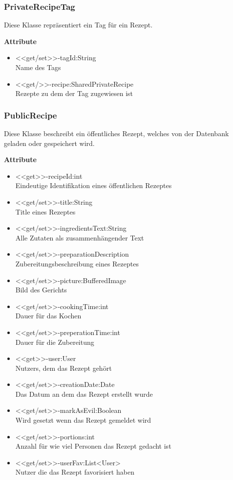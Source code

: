 \subsubsection{PrivateRecipeTag}
Diese Klasse repräsentiert ein Tag für ein Rezept.

\textbf{Attribute}
\begin{itemize}
	\item <<get/set>>-tagId:String \\Name des Tags
	\item <<get/>>-recipe:SharedPrivateRecipe \\Rezepte zu dem der Tag zugewiesen ist
\end{itemize}

\subsubsection{PublicRecipe}
Diese Klasse beschreibt ein öffentliches Rezept, welches von der Datenbank geladen oder gespeichert wird.

\textbf{Attribute}
\begin{itemize}
	\item <<get>>-recipeId:int\\Eindeutige Identifikation eines öffentlichen Rezeptes
	\item <<get/set>>-title:String\\Title eines Rezeptes
	\item <<get/set>>-ingredientsText:String\\Alle Zutaten als zusammenhängender Text
	\item <<get/set>>-preparationDescription\\Zubereitungsbeschreibung eines Rezeptes
	\item <<get/set>>-picture:BufferedImage\\Bild des Gerichts
	\item <<get/set>>-cookingTime:int\\Dauer für das Kochen
	\item <<get/set>>-preperationTime:int\\Dauer für die Zubereitung
	\item <<get>>-user:User\\Nutzers, dem das Rezept gehört
	\item <<get/set>>-creationDate:Date\\Das Datum an dem das Rezept erstellt wurde
	\item <<get/set>>-markAsEvil:Boolean \\Wird gesetzt wenn das Rezept gemeldet wird
	\item <<get/set>>-portions:int\\Anzahl für wie viel Personen das Rezept gedacht ist
	\item <<get/set>>-userFav:List<User> \\Nutzer die das Rezept favorisiert haben
\end{itemize}

